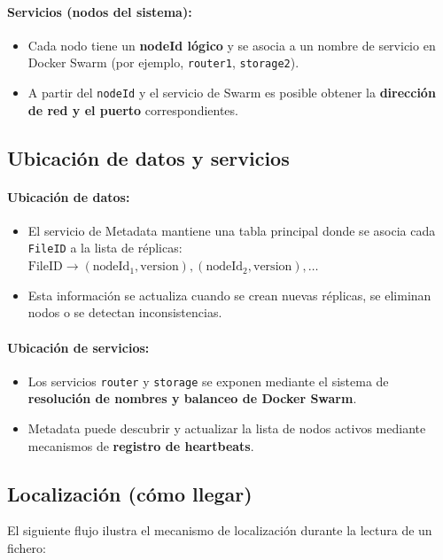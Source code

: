 \documentclass{article}
\begin{document}
\paragraph{Servicios (nodos del sistema):}
\begin{itemize}
    \item Cada nodo tiene un \textbf{nodeId lógico} y se asocia a un nombre de servicio en Docker Swarm (por ejemplo, \texttt{router1}, \texttt{storage2}).
    \item A partir del \texttt{nodeId} y el servicio de Swarm es posible obtener la \textbf{dirección de red y el puerto} correspondientes.
\end{itemize}

\subsection{Ubicación de datos y servicios}

\paragraph{Ubicación de datos:}
\begin{itemize}
    \item El servicio de Metadata mantiene una tabla principal donde se asocia cada \texttt{FileID} a la lista de réplicas:
    $ \mathrm{FileID} \rightarrow (\mathrm{nodeId}_1,\mathrm{version}), (\mathrm{nodeId}_2,\mathrm{version}), \ldots $
    \item Esta información se actualiza cuando se crean nuevas réplicas, se eliminan nodos o se detectan inconsistencias.
\end{itemize}

\paragraph{Ubicación de servicios:}
\begin{itemize}
    \item Los servicios \texttt{router} y \texttt{storage} se exponen mediante el sistema de \textbf{resolución de nombres y balanceo de Docker Swarm}.
    \item Metadata puede descubrir y actualizar la lista de nodos activos mediante mecanismos de \textbf{registro de heartbeats}.
\end{itemize}

\subsection{Localización (cómo llegar)}
El siguiente flujo ilustra el mecanismo de localización durante la lectura de un fichero:
\end{document}
